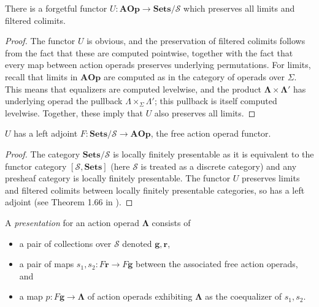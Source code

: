 \documentclass{amsbook} %
\newcommand{\mb}{\mathbf}
\renewcommand{\SS}{\mathcal{S}}
\numberwithin{section}{chapter}
\begin{document}
\begin{thm}\label{underlyingSS}
There is a forgetful functor $U:\mb{AOp} \rightarrow \mb{Sets}/\SS$ which preserves all limits and filtered colimits.
\end{thm}
\begin{proof}
The functor $U$ is obvious, and the preservation of filtered colimits follows from the fact that these are computed pointwise, together with the fact that every map between action operads preserves underlying permutations.  For limits, recall that limits in $\mb{AOp}$ are computed as in the category of operads over $\Sigma$.  This means that equalizers are computed levelwise, and the product $\mb{\Lambda} \times \mb{\Lambda}'$ has underlying operad the pullback $\Lambda \times_{\Sigma} \Lambda'$; this pullback is itself computed levelwise.  Together, these imply that $U$ also preserves all limits.
\end{proof}

\begin{cor}
$U$ has a left adjoint $F:\mb{Sets}/\SS \rightarrow \mb{AOp}$, the free action operad functor.
\end{cor}
\begin{proof}
The category $\mb{Sets}/\SS$ is locally finitely presentable as it is equivalent to the functor category $[\SS, \mb{Sets}]$ (here $\SS$ is treated as a discrete category) and any presheaf category is locally finitely presentable.  The functor $U$ preserves limits and filtered colimits between locally finitely presentable categories, so has a left adjoint (see Theorem 1.66 in \cite{ar}).
\end{proof}

\begin{Defi}
A \textit{presentation} for an action operad $\mb{\Lambda}$ consists of
\begin{itemize}
\item a pair of collections over $\SS$ denoted $\mathbf{g}, \mathbf{r}$,
\item a pair of maps $s_{1}, s_{2}:F\mathbf{r} \rightarrow F\mathbf{g}$ between the associated free action operads, and
\item a map $p:F\mathbf{g} \rightarrow \mb{\Lambda}$ of action operads exhibiting $\mb{\Lambda}$ as the coequalizer of $s_{1},s_{2}$.
\end{itemize}
\end{Defi}
\end{document}

